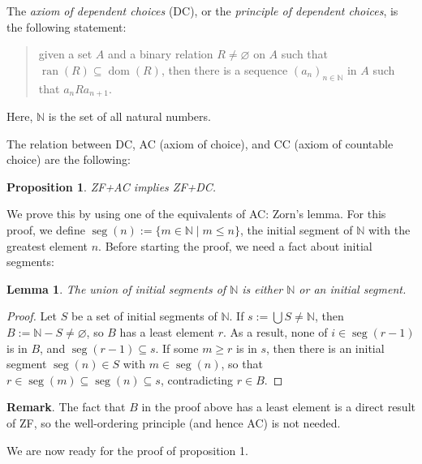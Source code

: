 \documentclass[12pt]{article}
\newtheorem{prop}{Proposition}
\newtheorem{lem}{Lemma}
\newcommand{\dom}[1]{\operatorname{dom}(#1)}
\newcommand{\ran}[1]{\operatorname{ran}(#1)}
\newcommand{\seg}[1]{\operatorname{seg}(#1)}
\begin{document}
The \emph{axiom of dependent choices} (DC), or the \emph{principle of dependent choices}, is the following statement:
\begin{quote}
given a set $A$ and a binary relation $R\ne \varnothing$ on $A$ such that $\ran{R}\subseteq \dom{R}$, then there is a sequence $(a_n)_{n\in \mathbb{N}}$ in $A$ such that $a_n R a_{n+1}$.
\end{quote}
Here, $\mathbb{N}$ is the set of all natural numbers.

The relation between DC, AC (axiom of choice), and CC (axiom of countable choice) are the following:

\begin{prop} ZF+AC implies ZF+DC. \end{prop}

We prove this by using one of the equivalents of AC: Zorn's lemma.  For this proof, we define $\seg{n}:=\lbrace m\in \mathbb{N} \mid m\le n\rbrace$, the initial segment of $\mathbb{N}$ with the greatest element $n$.  Before starting the proof, we need a fact about initial segments:
\begin{lem}  The union of initial segments of $\mathbb{N}$ is either $\mathbb{N}$ or an initial segment.  \end{lem}
\begin{proof}  Let $S$ be a set of initial segments of $\mathbb{N}$.  If $s:=\bigcup S \ne \mathbb{N}$, then  $B:=\mathbb{N}-S\ne \varnothing$, so $B$ has a least element $r$.  As a result, none of $i\in \seg{r-1}$ is in $B$, and $\seg{r-1}\subseteq s$.  If some $m \ge r$ is in $s$, then there is an initial segment $\seg{n} \in S$ with $m\in \seg{n}$, so that $r\in \seg{m} \subseteq \seg{n} \subseteq s$, contradicting $r\in B$. \end{proof}

\textbf{Remark}.  The fact that $B$ in the proof above has a least element is a direct result of ZF, so the well-ordering principle (and hence AC) is not needed.

We are now ready for the proof of proposition 1.
\end{document}
